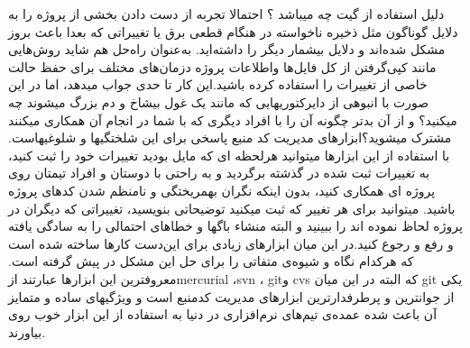 دلیل استفاده از گیت چه میباشد ؟\newline
احتمالا  تجربه از دست دادن بخشی از پروژه را به دلایل گوناگون مثل ذخیره ناخواسته در هنگام قطعی برق یا تغییراتی که بعدا باعث بروز مشکل شده‌اند و دلایل بیشمار دیگر را داشته‌اید. به‌عنوان راه‌حل هم شاید روش‌هایی مانند کپی‌گرفتن از کل فایل‌ها واطلاعات پروژه دزمان‌های مختلف برای حفظ حالت خاصی از تغییرات را استفاده کرده باشید.این کار تا حدی جواب میدهد، اما در این صورت با انبوهی از دایرکتوریهایی که مانند یک غول بیشاخ و دم بزرگ میشوند چه میکنید؟ و از آن بدتر چگونه آن را با افراد دیگری که با شما در انجام آن همکاری میکنند مشترک میشوید؟ابزارهای مدیریت کد منبع پاسخی برای این شلختگیها و شلوغیهاست. با استفاده از این ابزارها میتوانید هرلحظه ای که مایل بودید تغییرات خود را ثبت کنید، به تغییرات ثبت شده در گذشته برگردید و به راحتی با دوستان و افراد تیمتان روی پروژه ای همکاری کنید، بدون اینکه نگران بهمریختگی و نامنظم شدن کدهای پروژه باشید. میتوانید برای هر تغییر که ثبت میکنید توضیحاتی بنویسید، تغییراتی که دیگران در پروژه لحاظ نموده اند را ببینید و البته منشاء باگها و خطاهای احتمالی را به سادگی یافته و رفع و رجوع کنید.در این میان ابزارهای زیادی برای این‌دست ‌کارها ساخته شده است که هرکدام نگاه و شیوه‌ی متفاتی را برای حل این مشکل در پیش گرفته است. معروفترین این ابزارها عبارتند ازmercurial ،svn ، gitو cvs که البته در این میان git یکی از جوانترین و پرطرفدارترین ابزارهای مدیریت کدمنبع
است و ویژگیهای ساده و متمایز آن باعث شده عمده‌ی تیم‌های نرم‌افزاری در دنیا به استفاده از این ابزار خوب روی بیاورند. \newline

